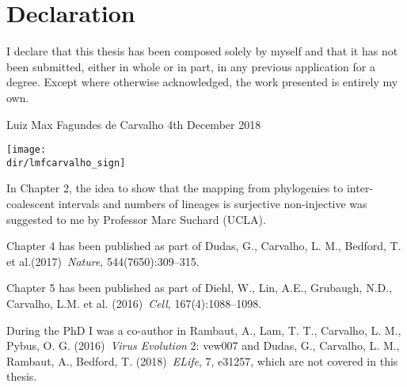 \chapter{Declaration}
\vspace*{2\baselineskip}
I declare that this thesis has been composed 
solely by myself and that it has not been submitted, either in whole or
in part, in any previous application for a degree.
Except where otherwise acknowledged, the work presented is entirely my
own.
\vspace{6\baselineskip}\\
\begin{flushright}
\hspace*{\fill}
Luiz Max Fagundes de Carvalho
\newline
4th December 2018

\texttt{[image: \\dir/lmfcarvalho\_sign]}

\end{flushright}

\cleardoublepage

In Chapter 2, the idea to show that the mapping from phylogenies to inter-coalescent intervals and numbers of lineages is surjective non-injective was suggested to me by Professor Marc Suchard (UCLA).

Chapter 4 has been published as part of Dudas, G., Carvalho, L. M., Bedford, T. et al.(2017)~\textit{Nature}, 544(7650):309--315.

Chapter 5 has been published as part of Diehl, W., Lin, A.E., Grubaugh, N.D., Carvalho, L.M. et al. (2016)~\textit{Cell}, 167(4):1088--1098.

During the PhD I was a co-author in Rambaut, A., Lam, T. T., Carvalho, L. M.,  Pybus, O. G. (2016)~\textit{Virus Evolution} 2: vew007 and Dudas, G., Carvalho, L. M., Rambaut, A.,  Bedford, T. (2018)~\textit{ELife}, 7, e31257, which are not covered in this thesis.
